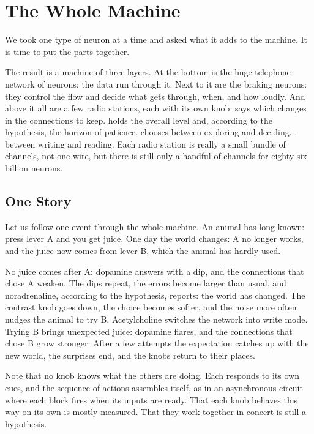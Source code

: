 \chapter{The Whole Machine}


We took one type of neuron at a time and asked what it adds to the machine. It is time to put the parts together.

The result is a machine of three layers. At the bottom is the huge telephone network of  neurons: the data run through it. Next to it are the braking  neurons: they control the flow and decide what gets through, when, and how loudly. And above it all are a few radio stations, each with its own knob.  says which changes in the connections to keep.  holds the overall level and, according to the hypothesis, the horizon of patience.  chooses between exploring and deciding. , between writing and reading. Each radio station is really a small bundle of channels, not one wire, but there is still only a handful of channels for eighty-six billion neurons.

\section*{One Story}

Let us follow one event through the whole machine. An animal has long known: press lever A and you get juice. One day the world changes: A no longer works, and the juice now comes from lever B, which the animal has hardly used.

No juice comes after A: dopamine answers with a dip, and the connections that chose A weaken. The dips repeat, the errors become larger than usual, and noradrenaline, according to the hypothesis, reports: the world has changed. The contrast knob goes down, the choice becomes softer, and the noise more often nudges the animal to try B. Acetylcholine switches the network into write mode. Trying B brings unexpected juice: dopamine flares, and the connections that chose B grow stronger. After a few attempts the expectation catches up with the new world, the surprises end, and the knobs return to their places.

Note that no knob knows what the others are doing. Each responds to its own cues, and the sequence of actions assembles itself, as in an asynchronous circuit where each block fires when its inputs are ready. That each knob behaves this way on its own is mostly measured. That they work together in concert is still a hypothesis.

